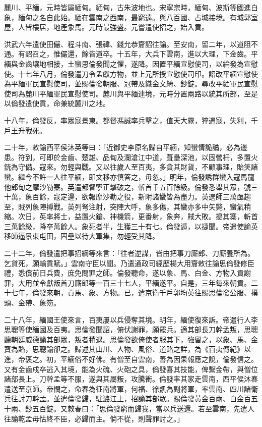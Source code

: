 \begin{pinyinscope}
麓川、平緬，元時皆屬緬甸。緬甸，古朱波地也。宋寧宗時，緬甸、波斯等國進白象，緬甸之名自此始。緬在雲南之西南，最窮遠。與八百國、占城接境。有城郭室屋，人皆樓居，地產象馬。元時最強盛。元嘗遣使招之，始入貢。

洪武六年遣使田儼、程斗南、張禕、錢允恭齎詔往諭。至安南，留二年，以道阻不通。有詔召之，惟儼還，餘皆道卒。十五年，大兵下雲南，進以大理，下金齒。平緬與金齒壤地相接，土蠻思倫發聞之懼，遂降。因置平緬宣慰使司，以綸發為宣慰使。十七年八月，倫發遣刀令孟獻方物，並上元所授宣慰使司印。詔改平緬宣慰使為平緬軍民宣慰使司，並賜倫發朝服、冠帶及織金文綺、鈔錠。尋改平緬軍民宣慰使司為麓川平緬軍民宣慰使司。麓川與平緬連境，元時分置兩路以統其所部，至是以倫發遣使貢，命兼統麓川之地。

十八年，倫發反，率眾寇景東。都督馮誠率兵擊之，值天大霧，猝遇寇，失利，千戶王升戰死。

二十年，敕諭西平侯沐英等曰：「近御史李原名歸自平緬，知蠻情詭譎，必為邊患。符到，可即於金齒、楚雄、品甸及瀾滄江中道，葺壘深池，以固營柵，多置火銃為守備。寇來。勿輕與戰。又以往歲人至百夷，多貪其財貨，不顧事理，貽笑諸蠻。繼今不許一人往平緬，即文移亦慎答之，毋忽。」明年，倫發誘群蠻入寇馬龍他郎甸之摩沙勒寨。英遣都督寧正擊破之，斬首千五百餘級。倫發悉舉其眾，號三十萬，象百餘，寇定邊，欲報摩沙勒之役，新附諸蠻皆為盡力。英選師三萬亟趨至，賊列象陣搏戰。英列弩注射，突陣大呼，象多傷，其蠻亦多中矢斃，蠻氣稍縮。次日，英率將士，益置火鎗、神機箭，更番射，象奔，賊大敗。搗其寨，斬首三萬餘級，降卒萬餘人。象死者半，生獲三十有七。倫發遁，以捷聞。帝遣使諭英移師逼景東屯田，固壘以待大軍集，勿輕受其降。

二十二年，倫發遣把事招綱等來言：「往者逆謀，皆由把事刀廝郎、刀廝養所為。乞貸死，願輸貢賦。」雲南守臣以聞。乃遣通政司經歷楊大用齎敕往諭思倫發修臣禮，悉償前日兵費，庶免問罪之師。倫發聽命，遂以象、馬、白金、方物入貢謝罪，大用並令獻叛首刀廝郎等一百三十七人，平緬遂平。自是，三年每來朝貢。二十七年，倫發來朝，貢馬、象、方物。已，遣京衛千戶郭均英往賜思倫發公服、襆頭、金帶、象笏。

二十八年，緬國王使來言，百夷屢以兵侵奪其境。明年，緬使復來訴。帝遣行人李思聰等使緬國及百夷。思倫發聞詔，俯伏謝罪，願罷兵。適其部長刀幹孟叛，思聰聽朝廷威德諭其部眾，叛者稍退。思倫發欲倚使者服其下，強留之，以象、馬、金寶為賂，思聰諭卻之。歸述其山川、人物、風俗、道路之詳，為《百夷傳紀》以進，帝褒之。初，平緬俗不好佛。有僧至自雲南，善為因果報應之說，倫發信之。又有金齒戍卒逃入其境，能為火硫、火砲之具，倫發喜其技能，俾繫金帶，與僧位諸部長上。刀幹孟等不服，遂與其屬叛，攻騰衝。倫發率其家走雲南，西平侯沐春遣送至京師。帝憫之，命春為征南將軍，何福、徐凱為副將軍，率雲南、四川諸衛兵往討刀幹孟。並遣倫發歸，駐潞江上，招諭其部眾。賜倫發黃金百兩、白金百五十兩、鈔五百錠。又敕春曰：「思倫發窮而歸我，當以兵送還。若至雲南，先遣人往諭乾孟毋怙終不臣，必歸而主。倘不從，則聲罪討之。」


\end{pinyinscope}
